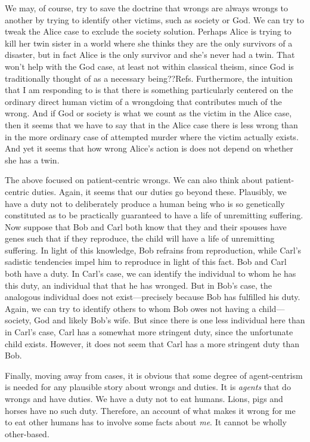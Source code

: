 We may, of course, try to save the doctrine that wrongs are always wrongs to another by trying to identify other victims, such as 
society or God. We can try to tweak the Alice case to exclude the society solution. Perhaps Alice is trying to kill her twin sister
in a world where she thinks they are the only survivors of a disaster, but in fact Alice is the only survivor and she's never had a
twin. That won't help with the God case, at least not within classical theism, since God is traditionally thought of as a necessary 
being??Refs. Furthermore, the intuition that I am responding to is that there is something particularly centered
on the ordinary direct human victim of a wrongdoing that contributes much of the wrong. And if God or society is what we count as 
the victim in the Alice case, then it seems that we have to say that in the Alice case there is less wrong than in the more ordinary
case of attempted murder where the victim actually exists. And yet it seems that how wrong Alice's action is does not depend on whether
she has a twin.

The above focused on patient-centric wrongs. We can also think about patient-centric duties. Again, it seems that our duties go 
beyond these. Plausibly, we have a duty not to deliberately produce a human being who is so genetically constituted as to be 
practically guaranteed to have a life of unremitting suffering. Now suppose that Bob and Carl both know that they and their 
spouses have genes such that if they reproduce, the child will have a life of unremitting suffering. In light of this knowledge,
Bob refrains from reproduction, while Carl's sadistic tendencies impel him to reproduce in light of this fact. Bob and Carl both
have a duty. In Carl's case, we can identify the individual to whom he has this duty, an individual that that he has wronged.
But in Bob's case, the analogous individual does not exist---precisely because Bob has fulfilled his duty. Again, we can try to
identify others to whom Bob owes not having a child---society, God and likely Bob's wife. But since there is one less individual
here than in Carl's case, Carl has a somewhat more stringent duty, since the unfortunate child exists. However, it does not seem
that Carl has a more stringent duty than Bob.

Finally, moving away from cases, it is obvious that some degree of agent-centrism is needed for any plausible story about wrongs 
and duties. It is \textit{agents} that do wrongs and have duties. We have a duty not to eat humans. Lions, pigs and horses have no 
such  duty. Therefore, an account of what makes it wrong for me to eat other humans has to involve some facts about \textit{me}.
It cannot be wholly other-based. 

